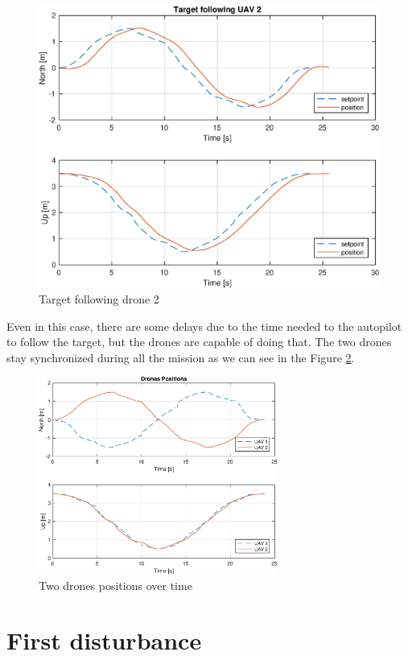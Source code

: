 \begin{figure}
\centering
\includegraphics[width=0.7\linewidth]{chapters/chapter-05/figures/following_2.eps}
\caption{Target following drone 2}
\label{fig:exp_following_2}
\end{figure}

Even in this case, there are some delays due to the time needed to the autopilot to follow
the target, but the drones are capable of doing that.
The two drones stay synchronized during all the mission as we can see in the Figure
\ref{fig:exp_overlapped}.

\begin{figure}
\centering
\includegraphics[width=0.7\textwidth]{chapters/chapter-05/figures/overlapped.eps}
\caption{Two drones positions over time}
\label{fig:exp_overlapped}
\end{figure}


\section{First disturbance}

